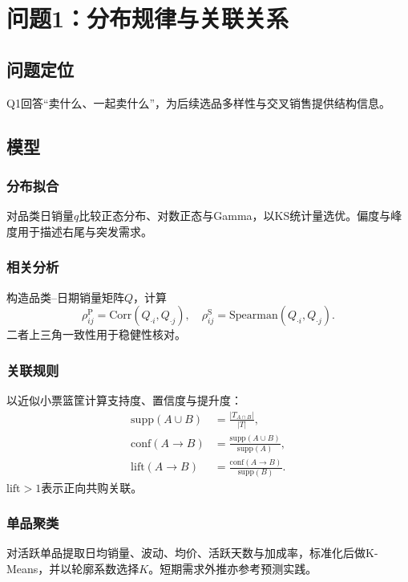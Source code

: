 \documentclass[UTF8,a4paper,12pt]{ctexart}
\begin{document}
\section{问题1：分布规律与关联关系}
\subsection{问题定位}
Q1回答``卖什么、一起卖什么''，为后续选品多样性与交叉销售提供结构信息。

\subsection{模型}
\subsubsection{分布拟合}
对品类日销量$q$比较正态分布、对数正态与Gamma，以KS统计量选优。偏度与峰度用于描述右尾与突发需求。

\subsubsection{相关分析}
构造品类--日期销量矩阵$Q$，计算
\begin{equation}
\rho_{ij}^{\mathrm{P}}=\mathrm{Corr}(Q_{\cdot i},Q_{\cdot j}),\quad
\rho_{ij}^{\mathrm{S}}=\mathrm{Spearman}(Q_{\cdot i},Q_{\cdot j}).
\end{equation}
二者上三角一致性用于稳健性核对。

\subsubsection{关联规则}
以近似小票篮筐计算支持度、置信度与提升度\cite{assoc}：
\begin{align}
\mathrm{supp}(A\cup B)&=\frac{|T_{A\cap B}|}{|T|},\\
\mathrm{conf}(A\to B)&=\frac{\mathrm{supp}(A\cup B)}{\mathrm{supp}(A)},\\
\mathrm{lift}(A\to B)&=\frac{\mathrm{conf}(A\to B)}{\mathrm{supp}(B)}.
\end{align}
$\mathrm{lift}>1$表示正向共购关联。

\subsubsection{单品聚类}
对活跃单品提取日均销量、波动、均价、活跃天数与加成率，标准化后做K-Means，并以轮廓系数选择$K$\cite{cluster}。短期需求外推亦参考预测实践\cite{forecast}。
\end{document}
